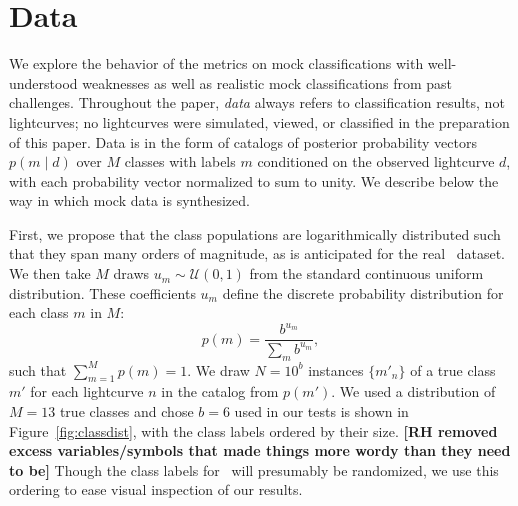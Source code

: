 \section{Data}
\label{sec:data}

We explore the behavior of the metrics on mock classifications with well-understood weaknesses as well as realistic mock classifications from past challenges.
Throughout the paper, \textit{data} always refers to classification results, not lightcurves; no lightcurves were simulated, viewed, or classified in the preparation of this paper.
Data is in the form of catalogs of posterior probability vectors $p(m \mid d)$ over $M$ classes with labels $m$ conditioned on the observed lightcurve $d$, with each probability vector normalized to sum to unity.
We describe below the way in which mock data is synthesized.

First, we propose that the class populations are logarithmically distributed such that they span many orders of magnitude, as is anticipated for the real \lsst\ dataset.
We then take $M$ draws $u_{m} \sim \mathcal{U}(0, 1)$ from the standard continuous uniform distribution. These coefficients $u_m$ define the discrete probability distribution for each class $m$ in $M:$ \begin{equation}p(m) = \frac{b^{u_{m}}}{\sum_{m} b^{u_{m}}},\end{equation} such that $\sum_{m=1}^{M} p(m) = 1$.
We draw $N = 10^{b}$ instances $\{m'_{n}\}$ of a true class $m'$ for each lightcurve $n$ in the catalog from $p(m')$.
We used a distribution of $M=13$ true classes and chose $b=6$ used in our tests is shown in Figure~\ref{fig:classdist}, with the class labels ordered by their size. \textbf{[RH removed excess variables/symbols that made things more wordy than they need to be]}
Though the class labels for \plasticc\ will presumably be randomized, we use this ordering to ease visual inspection of our results.

